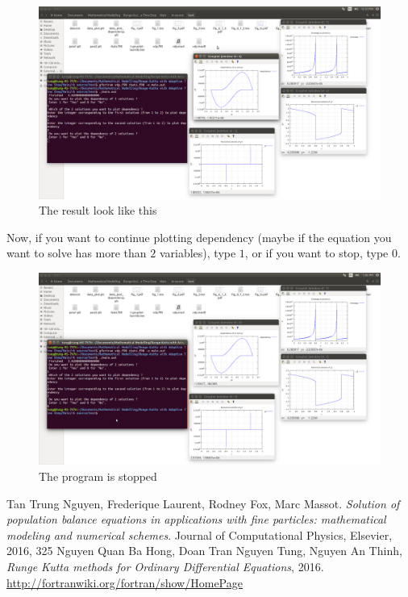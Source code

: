 \documentclass{article}
\begin{document}
	\begin{figure}[H]
		\centering	\includegraphics[width=15cm]{fig10}
		\caption{The result look like this}
	\end{figure}
	\noindent Now, if you want to continue plotting dependency (maybe if the equation you want to solve has more than $2$ variables), type $1$, or if you want to stop, type $0$.
	\begin{figure}[H]
		\centering	\includegraphics[width=15cm]{fig11}
		\caption{The program is stopped}
	\end{figure}
\newpage
\begin{thebibliography}{999}
	 Tan Trung Nguyen, Frederique Laurent, Rodney Fox, Marc Massot. \textit{Solution of population balance equations in applications with fine particles: mathematical modeling and numerical schemes}. Journal of Computational Physics, Elsevier, 2016, 325
	 Nguyen Quan Ba Hong, Doan Tran Nguyen Tung, Nguyen An Thinh, \textit{Runge Kutta methods for Ordinary Differential Equations}, 2016.
	 \url{http://fortranwiki.org/fortran/show/HomePage}
\end{thebibliography}
\end{document}
